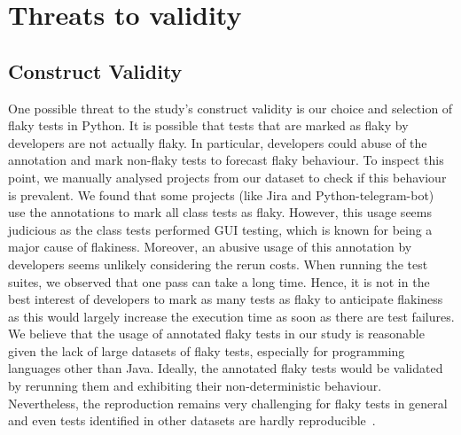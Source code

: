 \section{Threats to validity}
\label{sec:replication-threats}







\subsection{Construct Validity}
One possible threat to the study's construct validity is our choice and selection of flaky tests in Python.
It is possible that tests that are marked as flaky by developers are not actually flaky.
In particular, developers could abuse of the annotation and mark non-flaky tests to forecast flaky behaviour.
To inspect this point, we manually analysed projects from our dataset to check if this behaviour is prevalent.
We found that some projects (like Jira and Python-telegram-bot) use the annotations to mark all class tests as flaky.
However, this usage seems judicious as the class tests performed GUI testing, which is known for being a major cause of flakiness.
Moreover, an abusive usage of this annotation by developers seems unlikely considering the rerun costs.
When running the test suites, we observed that one pass can take a long time.
Hence, it is not in the best interest of developers to mark as many tests as flaky to anticipate flakiness as this would largely increase the execution time as soon as there are test failures. 
We believe that the usage of annotated flaky tests in our study is reasonable given the lack of large datasets of flaky tests, especially for programming languages other than Java.
Ideally, the annotated flaky tests would be validated by rerunning them and exhibiting their non-deterministic behaviour.
Nevertheless, the reproduction remains very challenging for flaky tests in general and even tests identified in other datasets are hardly reproducible~\cite{Pinto2020,Lam2020}.

